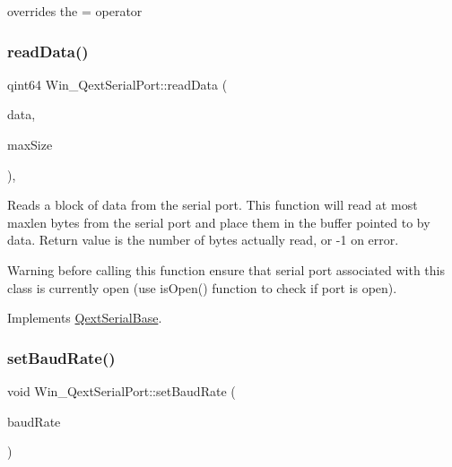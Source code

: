 overrides the = operator \mbox{\label{class_win___qext_serial_port_a39d6d73caac12dc1ca58d88b6e08dcb9}} 
\subsubsection{\texorpdfstring{read\+Data()}{readData()}}
{\footnotesize\ttfamily qint64 Win\+\_\+\+Qext\+Serial\+Port\+::read\+Data (\begin{DoxyParamCaption}\item[{char $\ast$}]{data,  }\item[{qint64}]{max\+Size }\end{DoxyParamCaption})\hspace{0.3cm}{\ttfamily [protected]}, {\ttfamily [virtual]}}

Reads a block of data from the serial port. This function will read at most maxlen bytes from the serial port and place them in the buffer pointed to by data. Return value is the number of bytes actually read, or -\/1 on error.

\begin{DoxyWarning}{Warning}
before calling this function ensure that serial port associated with this class is currently open (use is\+Open() function to check if port is open). 
\end{DoxyWarning}


Implements \mbox{\hyperlink{class_qext_serial_base}{Qext\+Serial\+Base}}.

\mbox{\label{class_win___qext_serial_port_aa5578e4862e3743da2a923f082f821d6}} 
\subsubsection{\texorpdfstring{set\+Baud\+Rate()}{setBaudRate()}}
{\footnotesize\ttfamily void Win\+\_\+\+Qext\+Serial\+Port\+::set\+Baud\+Rate (\begin{DoxyParamCaption}\item[{Baud\+Rate\+Type}]{baud\+Rate }\end{DoxyParamCaption})\hspace{0.3cm}{\ttfamily [virtual]}}

